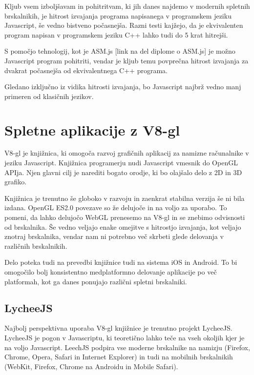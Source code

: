 Kljub vsem izboljšavam in pohitritvam, ki jih danes najdemo v modernih spletnih brskalnikih, je hitrost izvajanja programa napisanega v programskem jeziku Javascript, še vedno bistveno počasnejša. Razni testi kajžejo, da je ekvivalenten program napisan v programskem jeziku C++ lahko tudi do 5 krat hitrejši.

S pomočjo tehnologij, kot je ASM.js [link na del diplome o ASM.js] je možno Javascript program pohitriti, vendar je kljub temu povprečna hitrost izvajanja za dvakrat počasnejša od ekvivalentnega C++ programa.

Gledano izključno iz vidika hitrosti izvajanja, bo Javascript najbrž vedno manj primeren od klasičnih jezikov.

\section{Spletne aplikacije z V8-gl}

V8-gl je knjižnica, ki omogoča razvoj grafičnih aplikacij za namizne računalnike v jeziku Javascript. Knjižnica programerju nudi Javascript vmesnik do OpenGL APIja. Njen glavni cilj je narediti bogato orodje, ki bo olajšalo delo z 2D in 3D grafiko.

Knjižnica je trenutno še globoko v razvoju in zaenkrat stabilna verzija še ni bila izdana. OpenGL ES2.0 povezave so že delujoče in na voljo za uporabo. To pomeni, da lahko delujočo WebGL prenesemo na V8-gl in se znebimo odvisnosti od brskalnika. Še vedno veljajo enake omejitve s hitrostjo izvajanja, kot veljajo znotraj brskalnika, vendar nam ni potrebno več skrbeti glede delovanja v različnih brskalnikih.

Delo poteka tudi na prevedbi knjižnice tudi na sistema iOS in Android. To bi omogočilo bolj konsistentno medplatformno delovanje aplikacije po več platformah, kot ga danes ponujajo različni spletni brskalniki.

\subsection{LycheeJS}

Najbolj perspektivna uporaba V8-gl knjižnice je trenutno projekt LycheeJS. LycheeJS je pogon v Javascriptu, ki teoretično lahko teče na vseh okoljih kjer je na voljo Javascript. LeechJS podpira vse moderne brskalnike na namizju (Firefox, Chrome, Opera, Safari in Internet Explorer) in tudi na mobilnih brskalnikih (WebKit, Firefox, Chrome na Androidu in Mobile Safari). 

